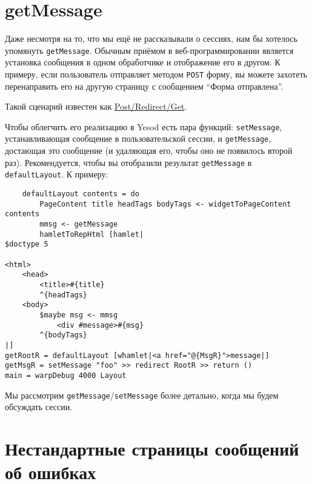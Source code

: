 \section {getMessage}

Даже несмотря на то, что мы ещё не рассказывали о сессиях, нам бы хотелось упомянуть \lstinline!getMessage!. Обычным приёмом в веб-программировании является установка сообщения в одном обработчике и отображение его в другом. К примеру, если пользователь отправляет методом \lstinline!POST! форму, вы можете захотеть перенаправить его на другую страницу с сообщением ``Форма отправлена''.

\begin{remark}
Такой сценарий известен как \href{http://en.wikipedia.org/wiki/Post/Redirect/Get}{Post/Redirect/Get}\footnotemark[\value{footnote}].
\end{remark}


Чтобы облегчить его реализацию в Yesod  есть пара функций: \lstinline!setMessage!, устанавливающая сообщение в пользовательской сессии, и \lstinline!getMessage!, достающая это сообщение (и удаляющая его, чтобы оно не появилось второй раз). Рекомендуется, чтобы вы отобразили результат \lstinline!getMessage! в \lstinline!defaultLayout!. К примеру:

\begin{lstlisting}
    defaultLayout contents = do
        PageContent title headTags bodyTags <- widgetToPageContent contents
        mmsg <- getMessage
        hamletToRepHtml [hamlet|
$doctype 5

<html>
    <head>
        <title>#{title}
        ^{headTags}
    <body>
        $maybe msg <- mmsg
            <div #message>#{msg}
        ^{bodyTags}
|]
getRootR = defaultLayout [whamlet|<a href="@{MsgR}">message|]
getMsgR = setMessage "foo" >> redirect RootR >> return ()
main = warpDebug 4000 Layout
\end{lstlisting}%

Мы рассмотрим \lstinline!getMessage!/\lstinline!setMessage! более детально, когда мы будем обсуждать сессии.

\section {Нестандартные страницы сообщений об ошибках}

